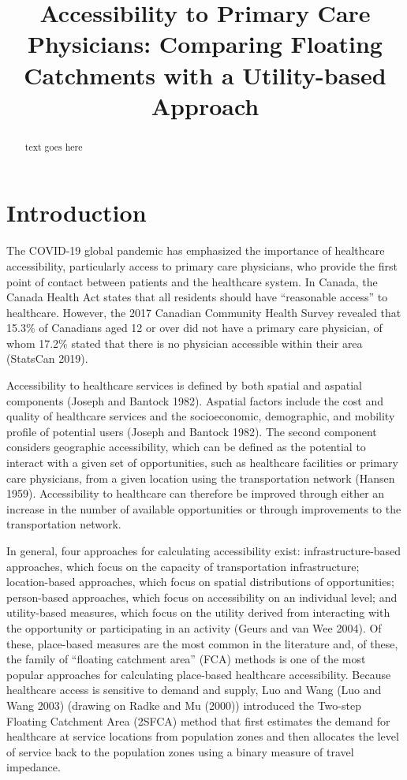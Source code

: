 \documentclass{article}
\title{Accessibility to Primary Care Physicians: Comparing Floating
Catchments with a Utility-based Approach}
\author{
  }
\begin{document}
\maketitle

\def\tightlist{}


\begin{abstract}
text goes here
\end{abstract}


\hypertarget{introduction}{%
\section{Introduction}\label{introduction}}

The COVID-19 global pandemic has emphasized the importance of healthcare
accessibility, particularly access to primary care physicians, who
provide the first point of contact between patients and the healthcare
system. In Canada, the Canada Health Act states that all residents
should have ``reasonable access'' to healthcare. However, the 2017
Canadian Community Health Survey revealed that 15.3\% of Canadians aged
12 or over did not have a primary care physician, of whom 17.2\% stated
that there is no physician accessible within their area (StatsCan 2019).

Accessibility to healthcare services is defined by both spatial and
aspatial components (Joseph and Bantock 1982). Aspatial factors include
the cost and quality of healthcare services and the socioeconomic,
demographic, and mobility profile of potential users (Joseph and Bantock
1982). The second component considers geographic accessibility, which
can be defined as the potential to interact with a given set of
opportunities, such as healthcare facilities or primary care physicians,
from a given location using the transportation network (Hansen 1959).
Accessibility to healthcare can therefore be improved through either an
increase in the number of available opportunities or through
improvements to the transportation network.

In general, four approaches for calculating accessibility exist:
infrastructure-based approaches, which focus on the capacity of
transportation infrastructure; location-based approaches, which focus on
spatial distributions of opportunities; person-based approaches, which
focus on accessibility on an individual level; and utility-based
measures, which focus on the utility derived from interacting with the
opportunity or participating in an activity (Geurs and van Wee 2004). Of
these, place-based measures are the most common in the literature and,
of these, the family of ``floating catchment area'' (FCA) methods is one
of the most popular approaches for calculating place-based healthcare
accessibility. Because healthcare access is sensitive to demand and
supply, Luo and Wang (Luo and Wang 2003) (drawing on Radke and Mu
(2000)) introduced the Two-step Floating Catchment Area (2SFCA) method
that first estimates the demand for healthcare at service locations from
population zones and then allocates the level of service back to the
population zones using a binary measure of travel impedance.
\end{document}
